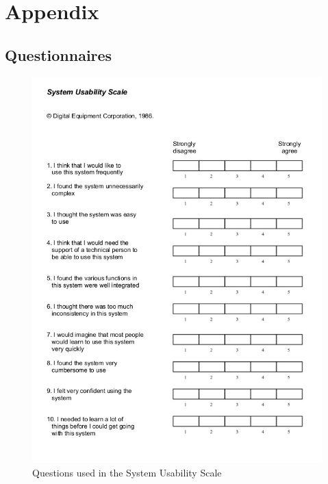 \documentclass[a4paper,12pt]{kth-mag}
\begin{document}
\chapter{Appendix}
\section{Questionnaires}\label{appA}
\begin{figure}[ht]
	\centering
	\includegraphics[keepaspectratio, scale = 0.8]{images/sus_quest.jpg}
	\caption{\small{Questions used in the System Usability Scale}}\label{Quest}
\end{figure}
\end{document}
